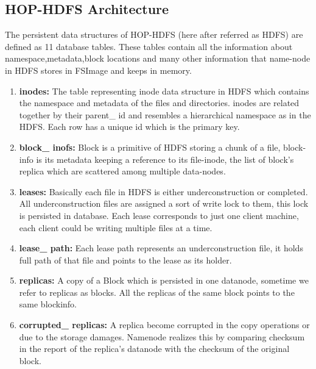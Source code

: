 \subsection{HOP-HDFS Architecture}
The persistent data structures of HOP-HDFS (here after referred as HDFS) are defined as 11 database tables. These tables contain all the information about namespace,metadata,block locations and many other information that name-node in HDFS stores in FSImage and keeps in memory.
\begin{enumerate}
\item \textbf{inodes:} The  table  representing  inode  data  structure  in  HDFS  which  contains   the namespace  and  metadata  of  the  files   and  directories.  inodes   are  related  together  by their  parent\_ id  and  resembles   a  hierarchical  namespace  as   in  the  HDFS.  Each  row has a unique id which is the primary key.
\item \textbf{block\_ inofs:} Block   is   a  primitive  of  HDFS  storing  a  chunk   of  a  file,  block-info  is   its
metadata  keeping  a  reference  to  its   file-inode,  the  list  of  block’s   replica  which  are
scattered among multiple data-nodes.
\item \textbf{leases:} Basically   each  file  in  HDFS  is   either  underconstruction  or  completed.  All
underconstruction  files   are  assigned  a  sort  of  write  lock   to  them,  this   lock   is
persisted  in database. Each lease corresponds  to just one client machine, each client
could be writing multiple files at a time.

\item \textbf{lease\_ path:} Each  lease  path  represents   an  underconstruction  file, it holds  full path
of that file and points to the lease as its holder.

\item \textbf{replicas:} A  copy   of  a  Block   which  is   persisted  in  one  datanode,  sometime we refer
to replicas as blocks. All the replicas of the same block points to the same blockinfo.

\item \textbf{corrupted\_ replicas: }A replica become corrupted in the copy  operations  or due to the
storage  damages.  Namenode  realizes   this   by   comparing  checksum   in  the  report of
the replica’s datanode with the checksum of the original block.


\end{enumerate}
